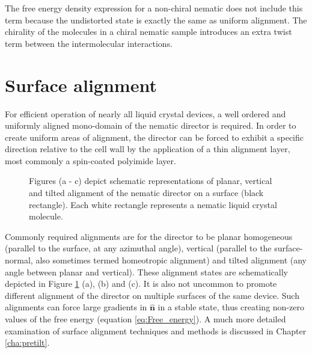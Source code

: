 The free energy density expression for a non-chiral nematic does not include this term because the undistorted state is exactly the same as uniform alignment. The chirality of the molecules in a chiral nematic sample introduces an extra twist term between the intermolecular interactions.

\section{Surface alignment}
For efficient operation of nearly all liquid crystal devices, a well ordered and uniformly aligned mono-domain of the nematic director is required. In order to create uniform areas of alignment, the director can be forced to exhibit a specific direction relative to the cell wall by the application of a thin alignment layer, most commonly a spin-coated polyimide layer. 

\begin{figure}
\begin{center}
\end{center}
\caption[Schematic depiction of planar, vertical and tilted alignment]{\label{fig:alignment}Figures (a - c) depict schematic representations of planar, vertical and tilted alignment of the nematic director on a surface (black rectangle). Each white rectangle represents a nematic liquid crystal molecule.}
\end{figure}

Commonly required alignments are for the director to be planar homogeneous (parallel to the surface, at any azimuthal angle), vertical (parallel to the surface-normal, also sometimes termed homeotropic alignment) and tilted alignment (any angle between planar and vertical). These alignment states are schematically depicted in Figure \ref{fig:alignment} (a), (b) and (c). It is also not uncommon to promote different alignment of the director on multiple surfaces of the same device. Such alignments can force large gradients in $\hat{\bm{n}}$ in a stable state, thus creating non-zero values of the free energy (equation \ref{eq:Free_energy}). A much more detailed examination of surface alignment techniques and methods is discussed in Chapter \ref{cha:pretilt}.

